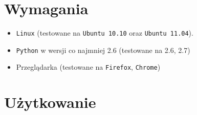 \documentclass[a4paper,notitlepage]{article}
\begin{document}
\pagestyle{fancy}
\tableofcontents
\section{Wymagania}
\begin{itemize}
\item \texttt{Linux} (testowane na \texttt{Ubuntu 10.10} oraz 
	\texttt{Ubuntu 11.04}).
\item \texttt{Python} w wersji co najmniej 2.6 (testowane na 2.6, 2.7)
\item Przeglądarka (testowane na \texttt{Firefox}, \texttt{Chrome})
\end{itemize}

\section{Użytkowanie}
\end{document}
